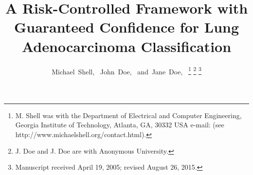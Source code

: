 \documentclass[journal]{IEEEtran}
\theoremstyle{remark}
\begin{document}
%
\title{A Risk-Controlled Framework with Guaranteed Confidence for Lung Adenocarcinoma Classification}
%
%
%

\author{Michael~Shell,~
        John~Doe,~
        and~Jane~Doe,~%
\thanks{M. Shell was with the Department
of Electrical and Computer Engineering, Georgia Institute of Technology, Atlanta,
GA, 30332 USA e-mail: (see http://www.michaelshell.org/contact.html).}%
\thanks{J. Doe and J. Doe are with Anonymous University.}%
\thanks{Manuscript received April 19, 2005; revised August 26, 2015.}}

% 
%
\end{document}
